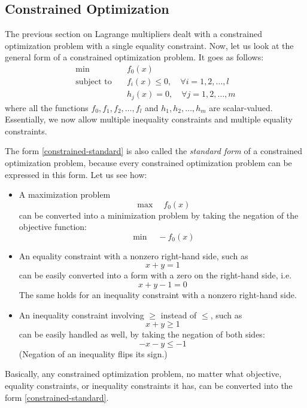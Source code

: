 \documentclass[a4paper]{article}
\theoremstyle{definition}
\begin{document}
\subsection{Constrained Optimization}

The previous section on Lagrange multipliers dealt with a constrained optimization problem with a single equality constraint.
Now, let us look at the general form of a constrained optimization problem.
It goes as follows:
\begin{equation}
	\label{constrained-standard}
	\begin{aligned}
		\min \quad & f_0(x) \\
		\text{subject to} \quad & f_i(x) \leq 0, \quad \forall i = 1, 2, \dots, l \\
		& h_j(x) = 0, \quad \forall j = 1, 2, \dots, m
	\end{aligned}
\end{equation}
where all the functions $f_0, f_1, f_2, \dots, f_l$ and $h_1, h_2, \dots, h_m$ are scalar-valued.
Essentially, we now allow multiple inequality constraints and multiple equality constraints.

The form \eqref{constrained-standard} is also called the \textit{standard form} of a constrained optimization problem, because every constrained optimization problem can be expressed in this form.
Let us see how:
\begin{itemize}
	\item A maximization problem
		\begin{equation*}
			\max \quad f_0(x)
		\end{equation*}
		can be converted into a minimization problem by taking the negation of the objective function:
		\begin{equation*}
			\min \quad -f_0(x)
		\end{equation*}
	\item An equality constraint with a nonzero right-hand side, such as
		\begin{equation*}
			x + y = 1
		\end{equation*}
		can be easily converted into a form with a zero on the right-hand side, i.e.
		\begin{equation*}
			x + y - 1 = 0
		\end{equation*}
		The same holds for an inequality constraint with a nonzero right-hand side.
	\item An inequality constraint involving $\geq$ instead of $\leq$, such as
		\begin{equation*}
			x + y \geq 1
		\end{equation*}
		can be easily handled as well, by taking the negation of both sides:
		\begin{equation*}
			- x - y \leq -1
		\end{equation*}
		(Negation of an inequality flips its sign.)
\end{itemize}
Basically, any constrained optimization problem, no matter what objective, equality constraints, or inequality constraints it has, can be converted into the form \eqref{constrained-standard}.
\end{document}
